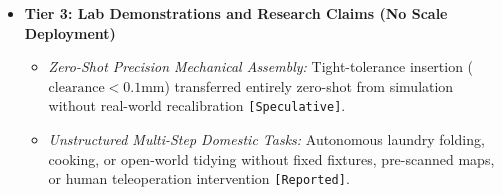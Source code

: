 \documentclass[11pt,a4paper]{article}
\begin{document}
\begin{itemize}
    \item \textbf{Tier 3: Lab Demonstrations and Research Claims (No Scale Deployment)}
    \begin{itemize}
        \item \textit{Zero-Shot Precision Mechanical Assembly:} Tight-tolerance insertion ($\text{clearance} < 0.1\text{mm}$) transferred entirely zero-shot from simulation without real-world recalibration \texttt{[Speculative]}.
        \item \textit{Unstructured Multi-Step Domestic Tasks:} Autonomous laundry folding, cooking, or open-world tidying without fixed fixtures, pre-scanned maps, or human teleoperation intervention \texttt{[Reported]}.
    \end{itemize}
\end{itemize}
\end{document}
